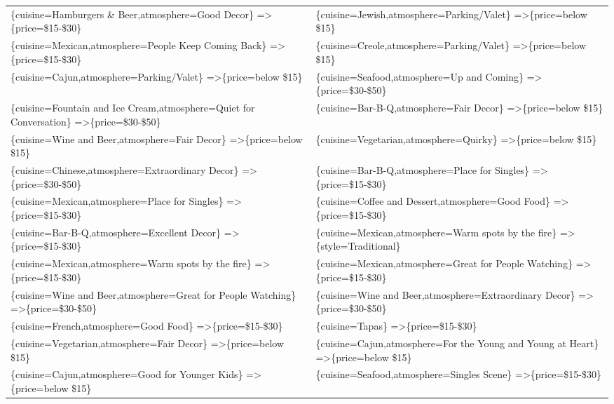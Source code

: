 \documentclass[letterpaper,10pt]{article}
\begin{document}
\begin{appendices}
\begin{table}[h]
\begin{adjustbox}{max width=\textwidth}
\begin{tabular}{ll}
\{cuisine=Hamburgers \& Beer,atmosphere=Good Decor\} =\textgreater \{price=\$15-\$30\} & \{cuisine=Jewish,atmosphere=Parking/Valet\} =\textgreater \{price=below \$15\} \\
\{cuisine=Mexican,atmosphere=People Keep Coming Back\} =\textgreater \{price=\$15-\$30\} & \{cuisine=Creole,atmosphere=Parking/Valet\} =\textgreater \{price=below \$15\} \\
\{cuisine=Cajun,atmosphere=Parking/Valet\} =\textgreater \{price=below \$15\} & \{cuisine=Seafood,atmosphere=Up and Coming\} =\textgreater \{price=\$30-\$50\} \\
\{cuisine=Fountain and Ice Cream,atmosphere=Quiet for Conversation\} =\textgreater \{price=\$30-\$50\} & \{cuisine=Bar-B-Q,atmosphere=Fair Decor\} =\textgreater \{price=below \$15\} \\
\{cuisine=Wine and Beer,atmosphere=Fair Decor\} =\textgreater \{price=below \$15\} & \{cuisine=Vegetarian,atmosphere=Quirky\} =\textgreater \{price=below \$15\} \\
\{cuisine=Chinese,atmosphere=Extraordinary Decor\} =\textgreater \{price=\$30-\$50\} & \{cuisine=Bar-B-Q,atmosphere=Place for Singles\} =\textgreater \{price=\$15-\$30\} \\
\{cuisine=Mexican,atmosphere=Place for Singles\} =\textgreater \{price=\$15-\$30\} & \{cuisine=Coffee and Dessert,atmosphere=Good Food\} =\textgreater \{price=\$15-\$30\} \\
\{cuisine=Bar-B-Q,atmosphere=Excellent Decor\} =\textgreater \{price=\$15-\$30\} & \{cuisine=Mexican,atmosphere=Warm spots by the fire\} =\textgreater \{style=Traditional\} \\
\{cuisine=Mexican,atmosphere=Warm spots by the fire\} =\textgreater \{price=\$15-\$30\} & \{cuisine=Mexican,atmosphere=Great for People Watching\} =\textgreater \{price=\$15-\$30\} \\
\{cuisine=Wine and Beer,atmosphere=Great for People Watching\} =\textgreater \{price=\$30-\$50\} & \{cuisine=Wine and Beer,atmosphere=Extraordinary Decor\} =\textgreater \{price=\$30-\$50\} \\
\{cuisine=French,atmosphere=Good Food\} =\textgreater \{price=\$15-\$30\} & \{cuisine=Tapas\} =\textgreater \{price=\$15-\$30\} \\
\{cuisine=Vegetarian,atmosphere=Fair Decor\} =\textgreater \{price=below \$15\} & \{cuisine=Cajun,atmosphere=For the Young and Young at Heart\} =\textgreater \{price=below \$15\} \\
\{cuisine=Cajun,atmosphere=Good for Younger Kids\} =\textgreater \{price=below \$15\} & \{cuisine=Seafood,atmosphere=Singles Scene\} =\textgreater \{price=\$15-\$30\} \\

\end{tabular}
\end{adjustbox}
\end{table}
\end{appendices}
\end{document}
